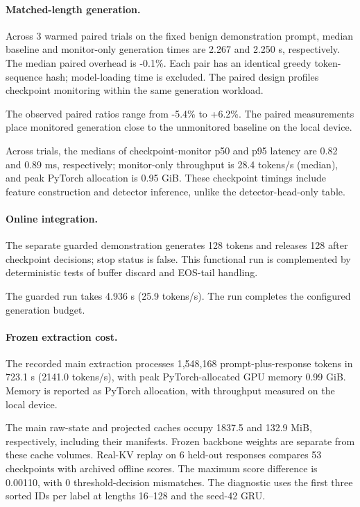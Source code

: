 \paragraph{Matched-length generation.}Across 3 warmed paired trials on the fixed benign demonstration prompt, median baseline and monitor-only generation times are 2.267 and 2.250 s, respectively. The median paired overhead is -0.1\%. Each pair has an identical greedy token-sequence hash; model-loading time is excluded. The paired design profiles checkpoint monitoring within the same generation workload.

The observed paired ratios range from -5.4\% to +6.2\%. The paired measurements place monitored generation close to the unmonitored baseline on the local device.

Across trials, the medians of checkpoint-monitor p50 and p95 latency are 0.82 and 0.89 ms, respectively; monitor-only throughput is 28.4 tokens/s (median), and peak PyTorch allocation is 0.95 GiB. These checkpoint timings include feature construction and detector inference, unlike the detector-head-only table.

\paragraph{Online integration.}The separate guarded demonstration generates 128 tokens and releases 128 after checkpoint decisions; stop status is false. This functional run is complemented by deterministic tests of buffer discard and EOS-tail handling.

The guarded run takes 4.936 s (25.9 tokens/s). The run completes the configured generation budget.

\paragraph{Frozen extraction cost.}The recorded main extraction processes 1,548,168 prompt-plus-response tokens in 723.1 s (2141.0 tokens/s), with peak PyTorch-allocated GPU memory 0.99 GiB. Memory is reported as PyTorch allocation, with throughput measured on the local device.

The main raw-state and projected caches occupy 1837.5 and 132.9 MiB, respectively, including their manifests. Frozen backbone weights are separate from these cache volumes.
Real-KV replay on 6 held-out responses compares 53 checkpoints with archived offline scores. The maximum score difference is 0.00110, with 0 threshold-decision mismatches. The diagnostic uses the first three sorted IDs per label at lengths 16--128 and the seed-42 GRU.
